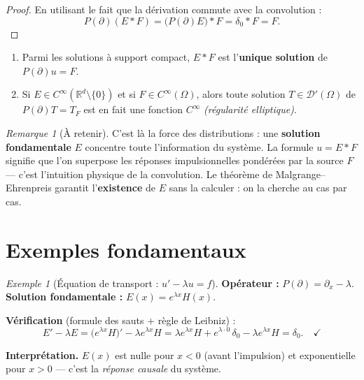 \documentclass[12pt,a4paper,openany]{book}
\theoremstyle{definition}
\theoremstyle{plain}
\theoremstyle{remark}
\newtheorem*{remark}{Remarque}
\newtheorem*{example}{Exemple}
\begin{document}
	\begin{proof}
		En utilisant le fait que la dérivation commute avec la convolution :
		\[
		P(\partial)(E * F) = \bigl(P(\partial)E\bigr) * F = \delta_0 * F = F.
		\]
	\end{proof}
	
	\begin{theorem}
		\begin{enumerate}[label=(\roman*), itemsep=4pt]
			\item Parmi les solutions à support compact, $E * F$ est l'\textbf{unique solution}
			de $P(\partial)u = F$.
			\item Si $E \in C^\infty(\mathbb{R}^d \setminus \{0\})$ et si $F \in C^\infty(\Omega)$,
			alors toute solution $T \in \mathcal{D}'(\Omega)$ de $P(\partial)T = T_F$
			est en fait une fonction $C^\infty$ \emph{(régularité elliptique)}.
		\end{enumerate}
	\end{theorem}
	
	\begin{remark}[À retenir]
		C'est là la force des distributions : une \textbf{solution fondamentale} $E$ concentre
		toute l'information du système. La formule $u = E * F$ signifie que l'on superpose
		les réponses impulsionnelles pondérées par la source $F$ — c'est l'intuition physique
		de la convolution. Le théorème de Malgrange–Ehrenpreis garantit l'\textbf{existence}
		de $E$ sans la calculer : on la cherche au cas par cas.
	\end{remark}
	
	\section{Exemples fondamentaux}
	
	\begin{example}[Équation de transport : $u' - \lambda u = f$]
		\textbf{Opérateur :} $P(\partial) = \partial_x - \lambda$.
		\textbf{Solution fondamentale :} $E(x) = e^{\lambda x}H(x)$.
		
		\medskip
		\textbf{Vérification} (formule des sauts + règle de Leibniz) :
		\[
		E' - \lambda E
		= \bigl(e^{\lambda x}H\bigr)' - \lambda e^{\lambda x}H
		= \lambda e^{\lambda x}H + e^{\lambda \cdot 0}\,\delta_0 - \lambda e^{\lambda x}H
		= \delta_0. \quad\checkmark
		\]
		
		\textbf{Interprétation.} $E(x)$ est nulle pour $x < 0$ (avant l'impulsion) et
		exponentielle pour $x > 0$ — c'est la \emph{réponse causale} du système.
	\end{example}
	
\end{document}
